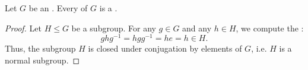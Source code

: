 \begin{lemma} \label{lemma:every_subgroup_of_an_abelian_group_is_a_normal_subgroup}
    Let $G$ be an . Every  of $G$ is a .
\end{lemma}
\begin{proof}
    Let $H \leq G$ be a subgroup. For any $g \in G$ and any $h \in H$, we compute the :
    $$ghg^{-1} = hgg^{-1} = he = h \in H.$$
    Thus, the subgroup $H$ is closed under conjugation by elements of $G$, i.e. $H$ is a normal subgroup.
\end{proof}
